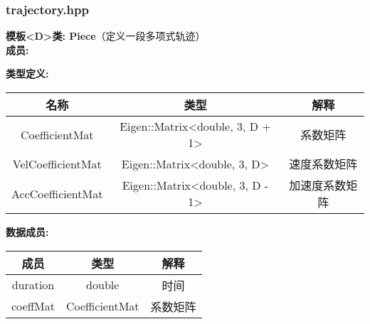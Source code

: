 \subsubsection{trajectory.hpp}
\begin{tcolorbox}[blue]
\textbf{模板<D>类: Piece}（定义一段多项式轨迹）\\  
\textbf{成员:}
\end{tcolorbox}
\begin{tcolorbox}[red]
\textbf{类型定义:}\\
\begin{tabular}{ccc}
    \toprule
    名称 & 类型  & 解释  \\
    \midrule
    CoefficientMat    & Eigen::Matrix<double, 3, D + 1> & 系数矩阵 \\
    VelCoefficientMat  &  Eigen::Matrix<double, 3, D>  & 速度系数矩阵  \\
    AccCoefficientMat   &  Eigen::Matrix<double, 3, D - 1>   & 加速度系数矩阵  \\
    \bottomrule
\end{tabular}

\end{tcolorbox}
\begin{tcolorbox}[red]
\textbf{数据成员:}\\
\begin{tabular}{ccc}
    \toprule
    成员 & 类型  & 解释  \\
    \midrule
    duration & double & 时间 \\
    coeffMat  &  CoefficientMat  & 系数矩阵  \\
    \bottomrule
\end{tabular}
\end{tcolorbox}

